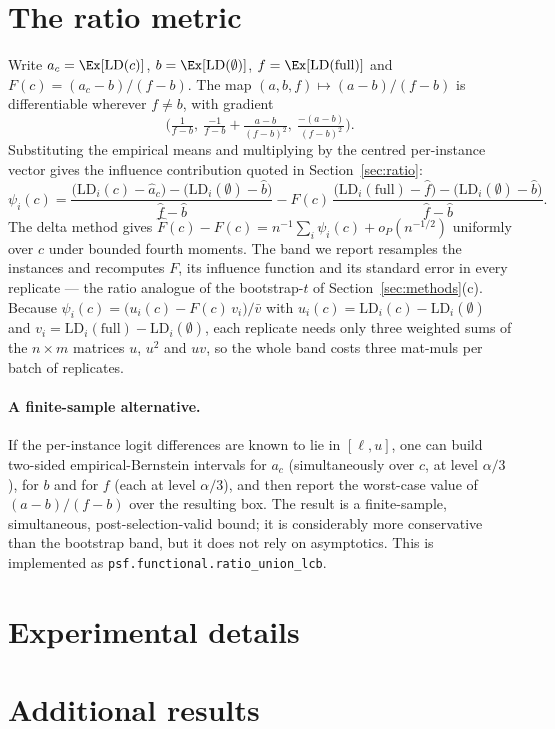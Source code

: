 \section{The ratio metric}
\label{app:ratio}

Write $a_c=\Ex[\mathrm{LD}(c)]$, $b=\Ex[\mathrm{LD}(\emptyset)]$,
$f=\Ex[\mathrm{LD}(\text{full})]$ and $F(c)=(a_c-b)/(f-b)$. The map
$(a,b,f)\mapsto(a-b)/(f-b)$ is differentiable wherever $f\ne b$, with gradient
\[
\Big(\tfrac{1}{f-b},\ \tfrac{-1}{f-b}+\tfrac{a-b}{(f-b)^2},\ \tfrac{-(a-b)}{(f-b)^2}\Big).
\]
Substituting the empirical means and multiplying by the centred per-instance
vector gives the influence contribution quoted in Section~\ref{sec:ratio}:
\[
\psi_i(c)=\frac{\big(\mathrm{LD}_i(c)-\hat a_c\big)-\big(\mathrm{LD}_i(\emptyset)-\hat b\big)}{\hat f-\hat b}
-\hat F(c)\,\frac{\big(\mathrm{LD}_i(\text{full})-\hat f\big)-\big(\mathrm{LD}_i(\emptyset)-\hat b\big)}{\hat f-\hat b}.
\]
The delta method gives $\hat F(c)-F(c)=n^{-1}\sum_i\psi_i(c)+o_P(n^{-1/2})$
uniformly over $c$ under bounded fourth moments. The band we report resamples
the instances and recomputes $F$, its influence function and its standard error
in every replicate --- the ratio analogue of the bootstrap-$t$ of
Section~\ref{sec:methods}(c). Because
$\psi_i(c) = \big(u_i(c) - F(c)\,v_i\big)/\bar v$ with
$u_i(c)=\mathrm{LD}_i(c)-\mathrm{LD}_i(\emptyset)$ and
$v_i=\mathrm{LD}_i(\text{full})-\mathrm{LD}_i(\emptyset)$, each replicate needs
only three weighted sums of the $n\times m$ matrices $u$, $u^2$ and $uv$, so the
whole band costs three mat-muls per batch of replicates.

\paragraph{A finite-sample alternative.}
If the per-instance logit differences are known to lie in $[\ell,u]$, one can
build two-sided empirical-Bernstein intervals for $a_c$ (simultaneously over $c$,
at level $\alpha/3$), for $b$ and for $f$ (each at level $\alpha/3$), and then
report the worst-case value of $(a-b)/(f-b)$ over the resulting box. The result
is a finite-sample, simultaneous, post-selection-valid bound; it is considerably
more conservative than the bootstrap band, but it does not rely on asymptotics.
This is implemented as \texttt{psf.functional.ratio\_union\_lcb}.

\section{Experimental details}
\label{app:details}



\section{Additional results}
\label{app:extra}





